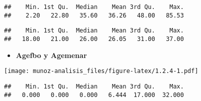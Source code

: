 \documentclass[
]{article}
\newenvironment{Shaded}{\begin{snugshade}}{\end{snugshade}}
\newcommand{\DataTypeTok}[1]{\textcolor[rgb]{0.13,0.29,0.53}{#1}}
\newcommand{\DecValTok}[1]{\textcolor[rgb]{0.00,0.00,0.81}{#1}}
\newcommand{\KeywordTok}[1]{\textcolor[rgb]{0.13,0.29,0.53}{\textbf{#1}}}
\newcommand{\NormalTok}[1]{#1}
\newcommand{\OperatorTok}[1]{\textcolor[rgb]{0.81,0.36,0.00}{\textbf{#1}}}
\newcommand{\StringTok}[1]{\textcolor[rgb]{0.31,0.60,0.02}{#1}}
\providecommand{\tightlist}{%
  \setlength{\itemsep}{0pt}\setlength{\parskip}{0pt}}
\begin{document}
\begin{verbatim}
##    Min. 1st Qu.  Median    Mean 3rd Qu.    Max. 
##    2.20   22.80   35.60   36.26   48.00   85.53
\end{verbatim}

\begin{Shaded}
\end{Shaded}

\begin{verbatim}
##    Min. 1st Qu.  Median    Mean 3rd Qu.    Max. 
##   18.00   21.00   26.00   26.05   31.00   37.00
\end{verbatim}

\begin{itemize}
\tightlist
\item
  \textbf{Agefbo y Agemenar}
\end{itemize}

\begin{Shaded}
\end{Shaded}

\texttt{[image: munoz-analisis\_files/figure-latex/1.2.4-1.pdf]}

\begin{Shaded}
\end{Shaded}

\begin{verbatim}
##    Min. 1st Qu.  Median    Mean 3rd Qu.    Max. 
##   0.000   0.000   0.000   6.444  17.000  32.000
\end{verbatim}

\begin{Shaded}
\end{Shaded}
\end{document}
